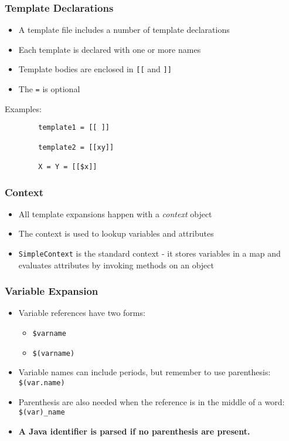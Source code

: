 \documentclass[a4paper,12pt,presentation]{beamer}
\begin{document}
\begin{frame}[fragile]
    \frametitle{Template Declarations}

    \begin{itemize}
        \item A template file includes a number of template declarations
        \item Each template is declared with one or more names
        \item Template bodies are enclosed in \verb'[[' and \verb']]'
        \item The \verb'=' is optional
    \end{itemize}

    Examples:
    \begin{verbatim}
        template1 = [[ ]]

        template2 = [[xy]]

        X = Y = [[$x]]
    \end{verbatim}
\end{frame}

\begin{frame}[fragile]
    \frametitle{Context}

    \begin{itemize}
        \item All template expansions happen with a \emph{context} object
        \item The context is used to lookup variables and attributes
        \item \verb'SimpleContext' is the standard context - it stores variables
            in a map and evaluates attributes by invoking methods on an object
    \end{itemize}
    
\end{frame}

\begin{frame}[fragile]
    \frametitle{Variable Expansion}

    \begin{itemize}
        \item Variable references have two forms:
            \begin{itemize}
                \item \verb'$varname'
                \item \verb'$(varname)'
            \end{itemize}
        \item Variable names can include periods, but remember to use
            parenthesis: \verb'$(var.name)'
        \item Parenthesis are also needed when the reference
            is in the middle of a word: \verb'$(var)_name'
        \item {\bf A Java identifier is parsed if no parenthesis are present.}
    \end{itemize}
    
\end{frame}
\end{document}
